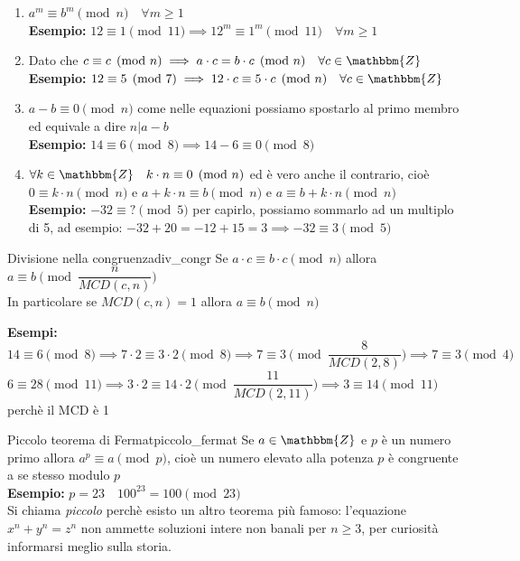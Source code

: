 \documentclass[12pt, letterpaper]{report}
\newcounter{theorem}
\newcommand{\nmu}{}
\begin{document}
		\begin{enumerate}
			\item $a^m \equiv b^m \pmod{n} \quad \forall m \geq 1$ \\
			\textbf{Esempio:} $12 \equiv 1 \pmod{11} \implies 12^m \equiv 1^m \pmod{11} \quad \forall m \geq1$
			\item Dato che $c \equiv c \pmod{n} \implies a \cdot c = b \cdot c \pmod{n} \quad \forall c \in \mathbbm{Z}$ \\
			\textbf{Esempio:} $12 \equiv 5 \pmod{7} \implies 12 \cdot c \equiv 5 \cdot c \pmod{n} \quad \forall c \in \mathbbm{Z}$
			\item $a - b \equiv 0 \pmod{n}$ come nelle equazioni possiamo spostarlo al primo membro ed equivale a dire $n|a-b$ \\
			\textbf{Esempio:} $14 \equiv 6 \pmod{8} \implies 14 - 6 \equiv 0 \pmod{8}$
			\item $\forall k \in \mathbbm{Z} \quad k \cdot n \equiv 0 \pmod{n}$ ed è vero anche il contrario, cioè $0 \equiv k \cdot n \pmod{n}$ e $a + k \cdot n \equiv b \pmod{n}$ e $a \equiv b + k \cdot n \pmod{n}$ \\
			\textbf{Esempio:} $-32 \equiv ? \pmod{5}$ per capirlo, possiamo sommarlo ad un multiplo di 5, ad esempio: $-32 + 20 = -12 + 15 = 3 \implies -32 \equiv 3 \pmod{5}$
		\end{enumerate}
		\begin{theorem}{\nmu Divisione nella congruenza}{div_congr}
			Se $a \cdot c \equiv b \cdot c \pmod{n}$ allora $a \equiv b \pmod{\dfrac{n}{MCD(c, n)}}$ \\
			In particolare se $MCD(c, n) = 1$ allora $a \equiv b \pmod{n}$
		\end{theorem}
		\textbf{Esempi:} $14 \equiv 6 \pmod{8} \implies 7 \cdot 2 \equiv 3 \cdot 2 \pmod{8} \implies 7 \equiv 3 \pmod{\dfrac{8}{MCD(2, 8)}} \implies 7 \equiv 3 \pmod{4}$ \\
		$6 \equiv 28 \pmod{11} \implies 3 \cdot 2 \equiv 14 \cdot 2 \pmod{\dfrac{11}{MCD(2, 11)}} \implies 3 \equiv 14 \pmod{11}$ perchè il MCD è 1
		\begin{theorem}{\nmu Piccolo teorema di Fermat}{piccolo_fermat}
			Se $a \in \mathbbm{Z}$ e $p$ è un numero primo allora $a^p \equiv a \pmod{p}$, cioè un numero elevato alla potenza $p$ è congruente a se stesso modulo $p$ \\
			\textbf{Esempio:} $p = 23 \quad 100^{23} = 100 \pmod{23}$ \\
			Si chiama \textit{piccolo} perchè esisto un altro teorema più famoso: l'equazione $x^n + y^n = z^n$ non ammette soluzioni intere non banali per $n \geq 3$, per curiosità informarsi meglio sulla storia.
		\end{theorem}
\end{document}
